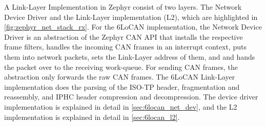 

A Link-Layer Implementation in Zephyr consist of two layers.
The Network Device Driver and the Link-Layer implementation (L2), which are highlighted in \autoref{fig:zephyr_net_stack_rx}.
For the 6LoCAN implementation, the Network Device Driver is an abstraction of the Zephyr CAN API that installs the respective frame filters,
handles the incoming CAN frames in an interrupt context, puts them into network packets, sets the Link-Layer address of them,
and and hands the packet over to the receiving work-queue. For sending CAN frames, the abstraction only forwards the raw CAN frames.
The 6LoCAN Link-Layer implementation does the parsing of the ISO-TP header, fragmentation and reassembly, and IPHC header compression and decompression.
The device driver implementation is explained in detail in \autoref{sec:6locan_net_dev},
and the L2 implementation is explained in detail in \autoref{sec:6locan_l2}.

\newpage

